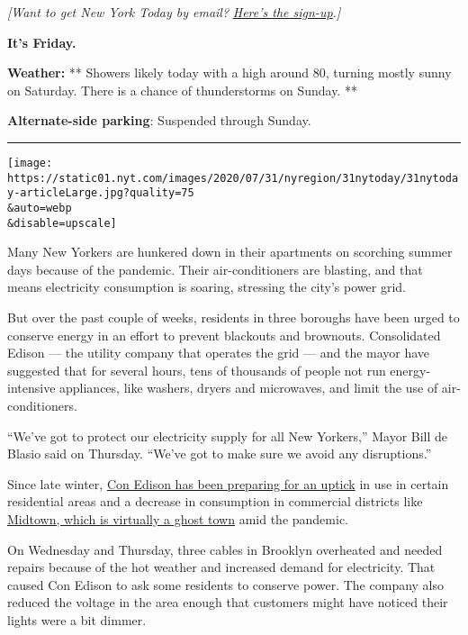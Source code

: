 \emph{{[}Want to get New York Today by email?}
\href{https://www.nytimes.com/newsletters/newyorktoday}{\emph{Here's the
sign-up}}\emph{.{]}}

\textbf{It's Friday.}

\textbf{Weather:} ** Showers likely today with a high around 80, turning
mostly sunny on Saturday. There is a chance of thunderstorms on Sunday.
**

\textbf{Alternate-side parking}: Suspended through Sunday.

\begin{center}\rule{0.5\linewidth}{\linethickness}\end{center}

\texttt{[image: https://static01.nyt.com/images/2020/07/31/nyregion/31nytoday/31nytoday-articleLarge.jpg?quality=75\\\&auto=webp\\\&disable=upscale]}

Many New Yorkers are hunkered down in their apartments on scorching
summer days because of the pandemic. Their air-conditioners are
blasting, and that means electricity consumption is soaring, stressing
the city's power grid.

But over the past couple of weeks, residents in three boroughs have been
urged to conserve energy in an effort to prevent blackouts and
brownouts. Consolidated Edison --- the utility company that operates the
grid --- and the mayor have suggested that for several hours, tens of
thousands of people not run energy-intensive appliances, like washers,
dryers and microwaves, and limit the use of air-conditioners.

``We've got to protect our electricity supply for all New Yorkers,''
Mayor Bill de Blasio said on Thursday. ``We've got to make sure we avoid
any disruptions.''

Since late winter,
\href{https://www.coned.com/en/about-us/media-center/news/20200520/con-edison-invests-for-summer-2020-and-new-yorks-clean-energy-future}{Con
Edison has been preparing for an uptick} in use in certain residential
areas and a decrease in consumption in commercial districts like
\href{https://www.nytimes.com/2020/07/26/nyregion/nyc-coronavirus-time-life-building.html}{Midtown,
which is virtually a ghost town} amid the pandemic.

On Wednesday and Thursday, three cables in Brooklyn overheated and
needed repairs because of the hot weather and increased demand for
electricity. That caused Con Edison to ask some residents to conserve
power. The company also reduced the voltage in the area enough that
customers might have noticed their lights were a bit dimmer.

